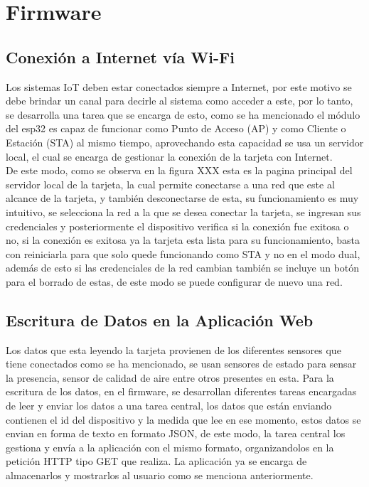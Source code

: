 \section{Firmware}

\subsection{Conexión a Internet vía Wi-Fi}

Los sistemas IoT deben estar conectados siempre a Internet, por este motivo se debe brindar un canal para decirle al sistema como acceder a este, por lo tanto, se desarrolla una tarea que se encarga de esto, como se ha mencionado el módulo del esp32 es capaz de funcionar como Punto de Acceso (AP) y como Cliente o Estación (STA) al mismo tiempo, aprovechando esta capacidad se usa un servidor local, el cual se encarga de gestionar la conexión de la tarjeta con Internet.\\

De este modo, como se observa en la figura XXX esta es la pagina principal del servidor local de la tarjeta, la cual permite conectarse a una red que este al alcance de la tarjeta, y también desconectarse de esta, su funcionamiento es muy intuitivo, se selecciona la red a la que se desea conectar la tarjeta, se ingresan sus credenciales y posteriormente el dispositivo verifica si la conexión fue exitosa o no, si la conexión es exitosa ya la tarjeta esta lista para su funcionamiento, basta con reiniciarla para que solo quede funcionando como STA y no en el modo dual, además de esto si las credenciales de la red cambian también se incluye un botón para el borrado de estas, de este modo se puede configurar de nuevo una red.

\subsection{Escritura de Datos en la Aplicación Web}

Los datos que esta leyendo la tarjeta provienen de los diferentes sensores que tiene conectados como se ha mencionado, se usan sensores de estado para sensar la presencia, sensor de calidad de aire entre otros presentes en esta. Para la escritura de los datos, en el firmware, se desarrollan diferentes tareas encargadas de leer y enviar los datos a una tarea central, los datos que están enviando contienen el id del dispositivo y la medida que lee en ese momento, estos datos se envian en forma de texto en formato JSON, de este modo, la tarea central los gestiona y envía a la aplicación con el mismo formato, organizandolos en la petición HTTP tipo GET que realiza. La aplicación ya se encarga de almacenarlos y mostrarlos al usuario como se menciona anteriormente.

